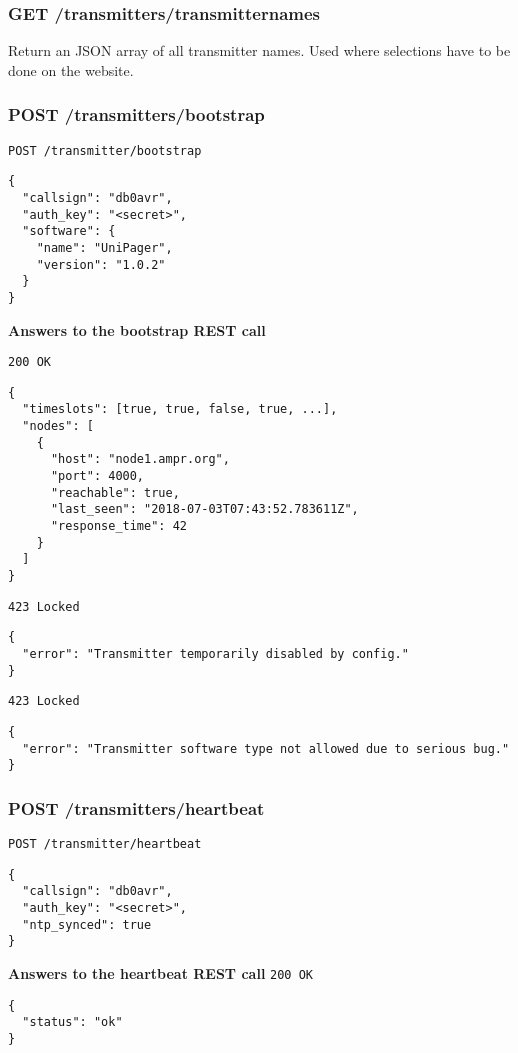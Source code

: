 \subsubsection{GET /transmitters/transmitternames}
Return an JSON array of all transmitter names. Used where selections have to be done on the website.

\subsubsection{POST /transmitters/bootstrap}
\label{protcoldef:transmitters:bootstrap}
\texttt{POST /transmitter/bootstrap}
\begin{lstlisting}
{
  "callsign": "db0avr",
  "auth_key": "<secret>",
  "software": {
    "name": "UniPager",
    "version": "1.0.2"
  }
}
\end{lstlisting}

\textbf{Answers to the bootstrap REST call}

\texttt{200 OK}
\begin{lstlisting}
{
  "timeslots": [true, true, false, true, ...],
  "nodes": [
    {
      "host": "node1.ampr.org",
      "port": 4000,
      "reachable": true,
      "last_seen": "2018-07-03T07:43:52.783611Z",
      "response_time": 42
    }
  ]
}
\end{lstlisting}

\texttt{423 Locked}
\begin{lstlisting}
{
  "error": "Transmitter temporarily disabled by config."
}
\end{lstlisting}

\texttt{423 Locked}
\begin{lstlisting}
{
  "error": "Transmitter software type not allowed due to serious bug."
}
\end{lstlisting}


\subsubsection{POST /transmitters/heartbeat}
\texttt{POST /transmitter/heartbeat}
\begin{lstlisting}
{
  "callsign": "db0avr",
  "auth_key": "<secret>",
  "ntp_synced": true
}
\end{lstlisting}

\textbf{Answers to the heartbeat REST call}
\texttt{200 OK}
\begin{lstlisting}
{
  "status": "ok"
}
\end{lstlisting}

